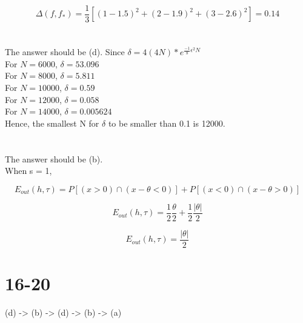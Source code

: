 \documentclass{article}
\begin{document}
\begin{CJK*}{UTF8}{bsmi}
 \begin{displaymath} 
 	\Delta(f, f_*) = \frac{1}{3} [(1-1.5)^2 + (2-1.9)^2 + (3-2.6)^2] = 0.14
 \end{displaymath}  

\section{}%
The answer should be (d). Since  $\delta = 4(4 N) * e^{\frac{-1}{8}\epsilon^2N}$\\ 

For $N = 6000$, $\delta = 53.096$\\

For $N = 8000$, $\delta = 5.811$\\

For $N = 10000$, $\delta = 0.59$\\

For $N = 12000$, $\delta =0.058$\\

For $N = 14000$, $\delta = 0.005624$\\
Hence, the smallest N for $\delta$ to be smaller than 0.1 is 12000.

\section{}%
The answer should be (b). \\

When s = 1,

 \begin{displaymath} 
	E_{out}(h,\tau) = P[(x>0) \cap (x-\theta <0 ) ] +  P[(x<0) \cap (x-\theta >0 ) ]
\end{displaymath}  

 \begin{displaymath} 
	E_{out}(h,\tau) = \frac{1}{2} \frac{\theta}{2}+  \frac{1}{2} \frac{|\theta|}{2}
\end{displaymath}  

\begin{displaymath} 
	E_{out}(h,\tau) = \frac{|\theta|}{2}
\end{displaymath}  

\section*{16-20}
(d) -> (b) -> (d) -> (b) -> (a)

\end{CJK*}
\end{document}
